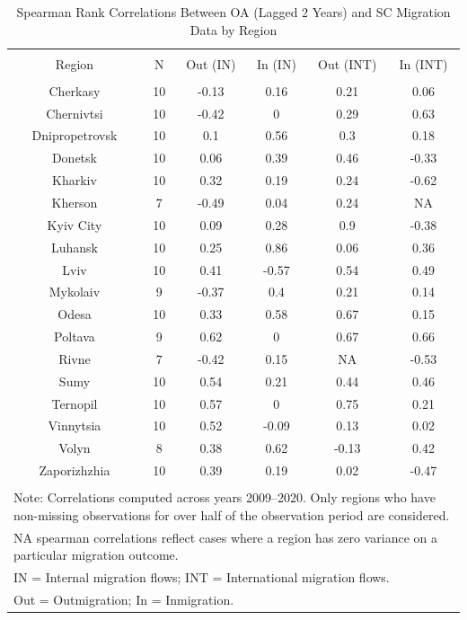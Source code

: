 
\begin{table}[!htbp] \centering 
  \caption{Spearman Rank Correlations Between OA (Lagged 2 Years) and SC Migration Data by Region} 
  \label{tab:spearman_correlations_lagged} 
\small 
\begin{tabular}{@{\extracolsep{3pt}} cccccc} 
\\[-1.8ex]\hline 
\hline \\[-1.8ex] 
Region & N & Out (IN) & In (IN) & Out (INT) & In (INT) \\ 
\hline \\[-1.8ex] 
Cherkasy & 10 & -0.13 & 0.16 & 0.21 & 0.06 \\ 
Chernivtsi & 10 & -0.42 & 0 & 0.29 & 0.63 \\ 
Dnipropetrovsk & 10 & 0.1 & 0.56 & 0.3 & 0.18 \\ 
Donetsk & 10 & 0.06 & 0.39 & 0.46 & -0.33 \\ 
Kharkiv & 10 & 0.32 & 0.19 & 0.24 & -0.62 \\ 
Kherson & 7 & -0.49 & 0.04 & 0.24 & NA \\ 
Kyiv City & 10 & 0.09 & 0.28 & 0.9 & -0.38 \\ 
Luhansk & 10 & 0.25 & 0.86 & 0.06 & 0.36 \\ 
Lviv & 10 & 0.41 & -0.57 & 0.54 & 0.49 \\ 
Mykolaiv & 9 & -0.37 & 0.4 & 0.21 & 0.14 \\ 
Odesa & 10 & 0.33 & 0.58 & 0.67 & 0.15 \\ 
Poltava & 9 & 0.62 & 0 & 0.67 & 0.66 \\ 
Rivne & 7 & -0.42 & 0.15 & NA & -0.53 \\ 
Sumy & 10 & 0.54 & 0.21 & 0.44 & 0.46 \\ 
Ternopil & 10 & 0.57 & 0 & 0.75 & 0.21 \\ 
Vinnytsia & 10 & 0.52 & -0.09 & 0.13 & 0.02 \\ 
Volyn & 8 & 0.38 & 0.62 & -0.13 & 0.42 \\ 
Zaporizhzhia & 10 & 0.39 & 0.19 & 0.02 & -0.47 \\ 
\hline \\[-1.8ex] 
\multicolumn{6}{l}{Note: Correlations computed across years 2009--2020. Only regions who have non-missing observations for over half of the observation period are considered.} \\ 
\multicolumn{6}{l}{NA spearman correlations reflect cases where a region has zero variance on a particular migration outcome.} \\ 
\multicolumn{6}{l}{IN = Internal migration flows; INT = International migration flows.} \\ 
\multicolumn{6}{l}{Out = Outmigration; In = Inmigration.} \\ 
\end{tabular} 
\end{table} 
